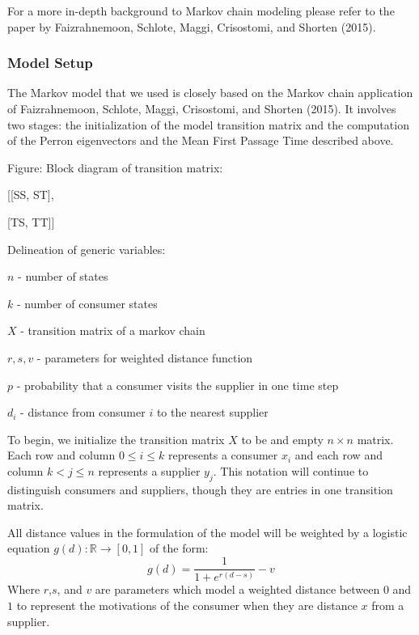 \documentclass[twoside,twocolumn]{article}
\begin{document}
For a more in-depth background to Markov chain modeling please refer to the paper by Faizrahnemoon, Schlote, Maggi, Crisostomi, and Shorten (2015).


\subsubsection{Model Setup}

The Markov model that we used is closely based on the Markov chain application of Faizrahnemoon, Schlote, Maggi, Crisostomi, and Shorten (2015).
It involves two stages: the initialization of the model transition matrix and the computation of the Perron eigenvectors and the Mean First Passage Time described above.


Figure: Block diagram of transition matrix:

[[SS, ST],

  [TS, TT]]



Delineation of generic variables:

$n$ - number of states

$k$ - number of consumer states

$X$ - transition matrix of a markov chain

$r, s, v$ - parameters for weighted distance function

$p$ - probability that a consumer visits the supplier in one time step

$d_{i}$ - distance from consumer $i$ to the nearest supplier

To begin, we initialize the transition matrix $X$ to be and empty $n \times n$ matrix.
Each row and column $0 \leq i \leq k$ represents a consumer $x_i$ and each row and column $k < j \leq n$ represents a supplier $y_j$.
This notation will continue to distinguish consumers and suppliers, though they are entries in one transition matrix. %

All distance values in the formulation of the model will be weighted by a logistic equation $g(d): \mathbb{R} \rightarrow [0,1]$ of the form:
$$g(d) = \frac{1}{1 + e^{r(d-s)}} - v$$
Where $r$,$s$, and $v$ are parameters which model  a weighted distance between $0$ and $1$ to represent the motivations of the consumer when they are distance $x$ from a supplier. %
\end{document}
